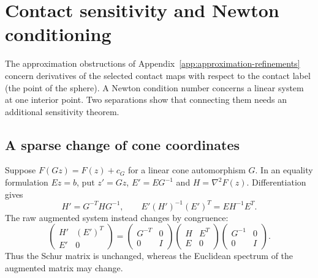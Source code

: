 \section{Contact sensitivity and Newton conditioning}
\label{sec:conditioning-counterexamples}

The approximation obstructions of
Appendix~\ref{app:approximation-refinements} concern derivatives of the
selected contact maps with respect to the contact label (the point of
the sphere).  A Newton condition number concerns a linear system at one
interior point.  Two separations show that connecting them needs an additional
sensitivity theorem.

\subsection{A sparse change of cone coordinates}

Suppose $F(Gz)=F(z)+c_G$ for a linear cone automorphism $G$.  In an
equality formulation $Ez=b$, put $z'=Gz$, $E'=EG^{-1}$ and
$H=\nabla^2F(z)$.  Differentiation gives
\begin{equation}\label{eq:conditioning-schur}
 H'=G^{-T}HG^{-1},\qquad
 E'(H')^{-1}(E')^T=EH^{-1}E^T.
\end{equation}
The raw augmented system instead changes by congruence:
\[
 \begin{pmatrix}H'&(E')^T\\E'&0\end{pmatrix}
 =\begin{pmatrix}G^{-T}&0\\0&I\end{pmatrix}
  \begin{pmatrix}H&E^T\\E&0\end{pmatrix}
  \begin{pmatrix}G^{-1}&0\\0&I\end{pmatrix}.
\]
Thus the Schur matrix is unchanged, whereas the Euclidean
spectrum of the augmented matrix may change.

